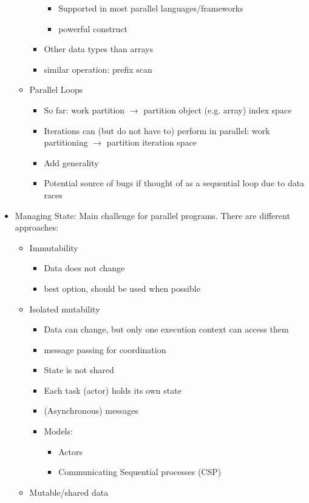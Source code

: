 \documentclass[a4paper]{article}
\begin{document}
\begin{itemize}
\begin{itemize}
\begin{itemize}
\begin{itemize}
\item Supported in most parallel languages/frameworks
\item powerful construct
\end{itemize}
\item Other data types than arrays
\item similar operation: prefix scan
\end{itemize}
\item Parallel Loops
\begin{itemize}
\item So far: work partition $\to$ partition object (e.g. array) index space
\item Iterations can (but do not have to) perform in parallel: work partitioning $\to$ partition iteration space
\item Add generality
\item Potential source of bugs if thought of as a sequential loop due to data races
\end{itemize}
\end{itemize}
\item Managing State: Main challenge for parallel programs. There are different approaches:
\begin{itemize}
\item Immutability
\begin{itemize}
\item Data does not change
\item best option, should be used when possible
\end{itemize}
\item Isolated mutability
\begin{itemize}
\item Data can change, but only one execution context can access them
\item message passing for coordination
\item State is not shared
\item Each task (actor) holds its own state
\item (Asynchronous) messages
\item Models:
\begin{itemize}
\item Actors
\item Communicating Sequential processes (CSP)
\end{itemize}
\end{itemize}
\item Mutable/shared data
\begin{itemize}

\end{itemize}
\end{itemize}
\end{itemize}
\end{document}
